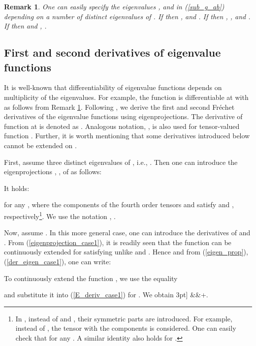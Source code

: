 \documentclass[a4paper,12pt]{article}
\newtheorem{remark}{Remark}[section]
\theoremstyle{remark}
\newcommand{\mbf}[1]{\mbox{\boldmath}}
\numberwithin{equation}{section}
\begin{document}
\begin{remark}
\emph{One can easily specify the eigenvalues ,  and  in (\ref{sub_g_ab}) depending on a number of distinct eigenvalues of  . If  then ,  and . If  then , , and . If  then  and , . }
\label{remark_subdif2}
\end{remark}


\subsection{First and second derivatives of eigenvalue functions}
\label{subsec_eigenprojection}

It is well-known that differentiability of eigenvalue functions depends on multiplicity of the eigenvalues. For example, the function  is differentiable at  with  as follows from  Remark \ref{remark_subdif2}. Following \cite{NPO08, CaHo86}, we derive the first and second Fr\'echet derivatives of the eigenvalue functions using eigenprojections.  The derivative of function  at  is denoted as . Analogous notation, , is also used for tensor-valued function  . Further, it is worth mentioning that some derivatives introduced below cannot be extended on .

First, assume three distinct eigenvalues of , i.e., . Then one can introduce the eigenprojections , , of  as follows:

It holds:



for any  , where the components of the fourth order tensors  and  satisfy
 and , respectively\footnote{In \cite[Appendix A]{NPO08}, instead of  and , their symmetric parts are introduced. For example, instead of , the tensor  with the components  is considered. One can easily check that  for any . A similar identity also holds for .}.
We use the notation ,  . 

Now, assume . In this more general case, one can introduce the derivatives of  and . From (\ref{eigenprojection_case1}), it is readily seen that the function  can be continuously extended for  satisfying  unlike  and . Hence and from (\ref{eigen_prop}), (\ref{der_eigen_case1}), one can write:

To continuously extend the function , we use the equality

and substitute it into (\ref{E_deriv_case1}) for . We obtain
3pt]
&&+\frac{(\eta_1+\eta_2-2\eta_3)\mbf E_3\otimes\mbf E_3+\eta_3[\mbf E_{12}\otimes\mbf E_3+\mbf E_3\otimes\mbf E_{12}]}{(\eta_3-\eta_1)(\eta_3-\eta_2)}.
\label{E3_deriv_case2}
\end{document}
